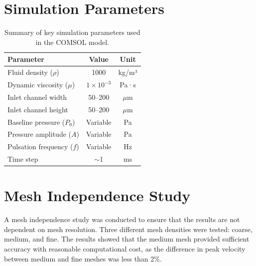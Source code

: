 \documentclass[12pt,a4paper]{article}
\renewcommand{\arraystretch}{1.2}
\begin{document}
\section{Simulation Parameters}

\begin{table}[H]
\centering
\caption{Summary of key simulation parameters used in the COMSOL model.}
\renewcommand{\arraystretch}{1.4}
\begin{tabular}{>{\raggedright}p{}cc}
\toprule
\textbf{Parameter} & \textbf{Value} & \textbf{Unit} \\
\midrule
Fluid density ($\rho$) & 1000 & kg/m³ \\
Dynamic viscosity ($\mu$) & $1 \times 10^{-3}$ & Pa·s \\
Inlet channel width & 50--200 & $\mu$m \\
Inlet channel height & 50--200 & $\mu$m \\
Baseline pressure ($P_0$) & Variable & Pa \\
Pressure amplitude ($A$) & Variable & Pa \\
Pulsation frequency ($f$) & Variable & Hz \\
Time step & $\sim$1 & ms \\
\bottomrule
\end{tabular}
\label{tab:parameters}
\end{table}

\section{Mesh Independence Study}

A mesh independence study was conducted to ensure that the results are not dependent on mesh resolution. Three different mesh densities were tested: coarse, medium, and fine. The results showed that the medium mesh provided sufficient accuracy with reasonable computational cost, as the difference in peak velocity between medium and fine meshes was less than 2\%.
\end{document}
